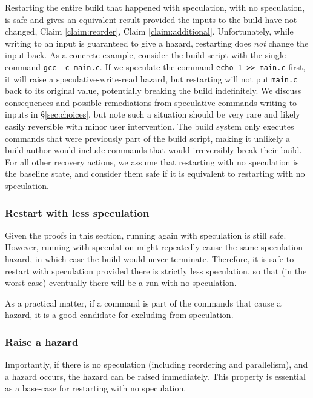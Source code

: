 Restarting the entire build that happened with speculation, with no speculation, is safe and gives an equivalent result provided the inputs to the build have not changed, Claim \ref{claim:reorder}, Claim \ref{claim:additional}. Unfortunately, while writing to an input is guaranteed to give a hazard, restarting does \emph{not} change the input back. As a concrete example, consider the build script with the single command \texttt{gcc -c main.c}. If we speculate the command \texttt{echo 1 >> main.c} first, it will raise a speculative-write-read hazard, but restarting will not put \texttt{main.c} back to its original value, potentially breaking the build indefinitely. We discuss consequences and possible remediations from speculative commands writing to inputs in \S\ref{sec:choices}, but note such a situation should be very rare and likely easily reversible with minor user intervention.  The build system only executes commands that were previously part of the build script, making it unlikely a build author would include commands that would irreversibly break their build.  For all other recovery actions, we assume that restarting with no speculation is the baseline state, and consider them safe if it is equivalent to restarting with no speculation.

\subsubsection{Restart with less speculation}

Given the proofs in this section, running again with speculation is still safe. However, running with speculation might repeatedly cause the same speculation hazard, in which case the build would never terminate. Therefore, it is safe to restart with speculation provided there is strictly less speculation, so that (in the worst case) eventually there will be a run with no speculation.

As a practical matter, if a command is part of the commands that cause a hazard, it is a good candidate for excluding from speculation.

\subsubsection{Raise a hazard}

Importantly, if there is no speculation (including reordering and parallelism), and a hazard occurs, the hazard can be raised immediately. This property is essential as a base-case for restarting with no speculation.

